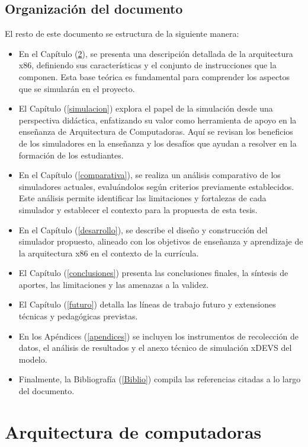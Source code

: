 \documentclass[12pt,oneside]{templates/unerthesis}
\begin{document}
\hypertarget{organizaciuxf3n-del-documento}{%
\section{Organización del documento}\label{organizaciuxf3n-del-documento}}

El resto de este documento se estructura de la siguiente manera:

\begin{itemize}
\item
  En el Capítulo (\ref{arquitectura}), se presenta una descripción detallada de la arquitectura x86, definiendo sus características y el conjunto de instrucciones que la componen. Esta base teórica es fundamental para comprender los aspectos que se simularán en el proyecto.
\item
  El Capítulo (\ref{simulacion}) explora el papel de la simulación desde una perspectiva didáctica, enfatizando su valor como herramienta de apoyo en la enseñanza de Arquitectura de Computadoras. Aquí se revisan los beneficios de los simuladores en la enseñanza y los desafíos que ayudan a resolver en la formación de los estudiantes.
\item
  En el Capítulo (\ref{comparativa}), se realiza un análisis comparativo de los simuladores actuales, evaluándolos según criterios previamente establecidos. Este análisis permite identificar las limitaciones y fortalezas de cada simulador y establecer el contexto para la propuesta de esta tesis.
\item
  En el Capítulo (\ref{desarrollo}), se describe el diseño y construcción del simulador propuesto, alineado con los objetivos de enseñanza y aprendizaje de la arquitectura x86 en el contexto de la currícula.
\item
  El Capítulo (\ref{conclusiones}) presenta las conclusiones finales, la síntesis de aportes, las limitaciones y las amenazas a la validez.
\item
  El Capítulo (\ref{futuro}) detalla las líneas de trabajo futuro y extensiones técnicas y pedagógicas previstas.
\item
  En los Apéndices (\ref{apendices}) se incluyen los instrumentos de recolección de datos, el análisis de resultados y el anexo técnico de simulación xDEVS del modelo.
\item
  Finalmente, la Bibliografía (\ref{Biblio}) compila las referencias citadas a lo largo del documento.
\end{itemize}

\hypertarget{arquitectura}{%
\chapter{Arquitectura de computadoras}\label{arquitectura}}
\end{document}
